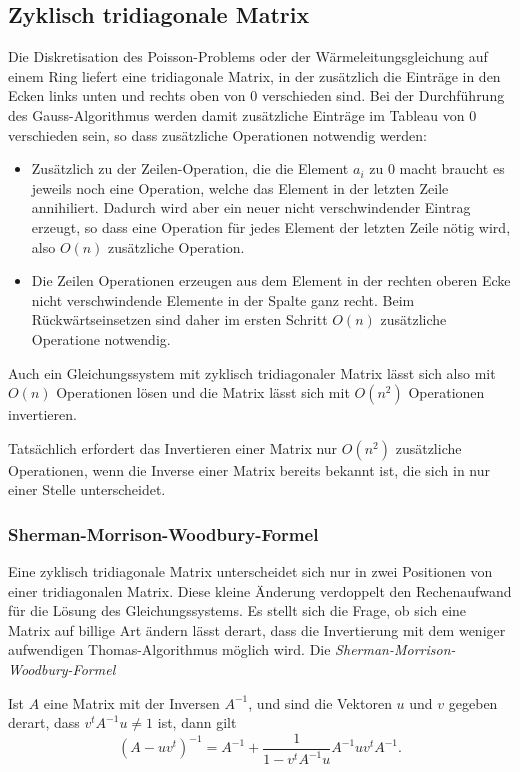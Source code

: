 \subsection{Zyklisch tridiagonale Matrix
\label{buch:subsection:zyklischtridiagonal}}
Die Diskretisation des Poisson-Problems oder der Wärmeleitungsgleichung
auf einem Ring liefert eine tridiagonale Matrix, in der zusätzlich die
Einträge in den Ecken links unten und rechts oben von $0$ verschieden sind.
Bei der Durchführung des Gauss-Algorithmus werden damit zusätzliche 
Einträge im Tableau von $0$ verschieden sein, so dass zusätzliche Operationen
notwendig werden:
\begin{itemize}
\item 
Zusätzlich zu der Zeilen-Operation, die die Element 
$a_i$ zu $0$ macht braucht es jeweils noch eine Operation, welche das
Element in der letzten Zeile annihiliert.
Dadurch wird aber ein neuer nicht verschwindender Eintrag erzeugt,
so dass eine Operation für jedes Element der letzten Zeile nötig wird,
also $O(n)$ zusätzliche Operation.
\item
Die Zeilen Operationen erzeugen aus dem Element in der rechten oberen
Ecke nicht verschwindende Elemente in der Spalte ganz recht.
Beim Rückwärtseinsetzen sind daher im ersten Schritt $O(n)$ 
zusätzliche Operatione notwendig.
\end{itemize}
Auch ein Gleichungssystem mit zyklisch tridiagonaler Matrix lässt sich also 
mit $O(n)$ Operationen lösen und die Matrix lässt sich mit $O(n^2)$
Operationen invertieren.

Tatsächlich erfordert das Invertieren einer Matrix nur $O(n^2)$
zusätzliche Operationen, wenn die Inverse einer Matrix bereits
bekannt ist, die sich in nur einer Stelle unterscheidet.

\subsubsection{Sherman-Morrison-Woodbury-Formel}
Eine zyklisch tridiagonale Matrix unterscheidet sich nur in zwei 
Positionen von einer tridiagonalen Matrix.
Diese kleine Änderung verdoppelt den Rechenaufwand für die Lösung
des Gleichungssystems.
Es stellt sich die Frage, ob sich eine Matrix auf billige Art
ändern lässt derart, dass die Invertierung mit dem weniger
aufwendigen Thomas-Algorithmus möglich wird.
Die {\em Sherman-Morrison-Woodbury-Formel} 

\begin{satz}
\label{buch:satz:shermann}
Ist $A$ eine Matrix mit der Inversen $A^{-1}$, und sind die Vektoren
$u$ und $v$ gegeben derart, dass $v^tA^{-1}u\ne 1$ ist, dann gilt
\begin{equation}
(A-uv^t)^{-1}
=
A^{-1} + \frac{1}{1-v^tA^{-1}u} A^{-1}uv^tA^{-1}.
\label{buch:equation:shermann-morrison-woodburry}
\end{equation}
\end{satz}

